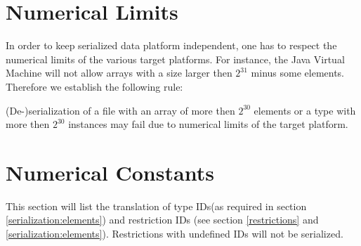 \section{Numerical Limits}

In order to keep serialized data platform independent, one has to respect the numerical limits of the various target platforms. For instance, the Java Virtual Machine will not allow arrays with a size larger then $2^31$ minus some elements. Therefore we establish the following rule:

(De-)serialization of a file with an array of more then $2^30$ elements or a type with more then $2^30$ instances may fail due to numerical limits of the target platform.

\section{Numerical Constants}
\label{app:constants}

This section will list the translation of type IDs(as required in section \ref{serialization:elements}) and restriction IDs (see section \ref{restrictions} and \ref{serialization:elements}). Restrictions with undefined IDs will not be serialized.

